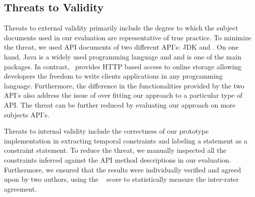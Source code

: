 \subsection{Threats to Validity}
\label{sub:threats_to_validity}
Threats to external validity primarily include the degree to which the subject documents used in our evaluation are representative of true practice. To minimize the threat, we used API documents of two different API's: JDK  and \amazon. On one hand, Java is a widely used programming language and  and is one of the main packages. In contrast, \amazon\ provides HTTP based access to online storage allowing developers the freedom to write clients applications in any programming language. Furthermore, the difference in the functionalities provided by the two API's also address the issue of over fitting our approach to a particular type of API. The threat can be further reduced by evaluating our approach on more subjects API's. 

Threats to internal validity include the correctness of our prototype implementation in extracting temporal constraints and labeling a statement as a constraint statement. To reduce the threat, we manually inspected all the constraints inferred against the API method descriptions in our evaluation. Furthermore, we ensured that the results were individually verified and agreed upon by two authors, using the ~\cite{carletta1996assessing} score to statistically measure the inter-rater agreement.




